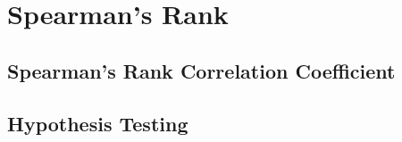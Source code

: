 \documentclass[../alevelmaths.tex]{subfiles}
\begin{document}
\chapter{Spearman's Rank}
\section{Spearman's Rank Correlation Coefficient}
\section{Hypothesis Testing}
\end{document}
